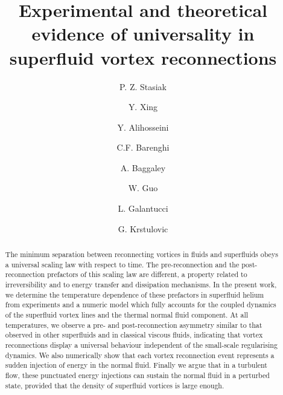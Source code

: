 \documentclass[%
superscriptaddress,
 amsmath,amssymb,
 aps,
]{revtex4-2}
\begin{document}

\title{Experimental and theoretical evidence of universality in superfluid vortex reconnections}

\author{P. Z. Stasiak}

\author{Y. Xing}
\author{Y. Alihosseini}

\author{C.F. Barenghi}
\author{A. Baggaley}

\author{W. Guo}

\author{L. Galantucci}

\author{G. Krstulovic}



\begin{abstract}
The minimum separation between reconnecting vortices
in fluids and superfluids obeys a universal scaling law with respect to time.
The pre-reconnection and the post-reconnection prefactors 
of this scaling law are different, a property related to irreversibility and to energy
transfer and dissipation mechanisms.
In the present work, we determine the temperature dependence of these prefactors in superfluid helium
from experiments and a numeric model which fully accounts for the 
coupled dynamics of the superfluid
vortex lines and the thermal normal fluid component. At all temperatures, we observe 
a pre- and post-reconnection asymmetry similar to that observed in other superfluids
and in classical viscous fluids, indicating that vortex reconnections display a
universal behaviour independent of 
the small-scale regularising dynamics.   
We also numerically show that each vortex reconnection event
represents a sudden injection of energy in the normal fluid. 
Finally we argue that
in a turbulent flow, these punctuated energy injections can sustain 
the normal fluid
in a perturbed state, provided that the density of superfluid vortices is large enough.
\end{abstract}
\end{document}
